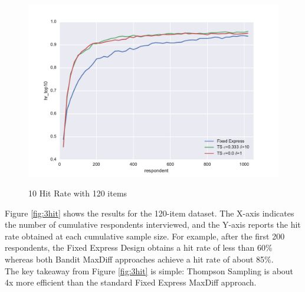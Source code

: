 \documentclass[mksc,blindrev]{informs3} %
\begin{document}
\begin{figure}
\caption{10 Hit Rate with 120 items}
\includegraphics[width=1\textwidth]{plots/10hitrate120show3.pdf}
\label{fig:10hit}
\end{figure}
Figure \ref{fig:3hit} shows the results for the 120-item dataset.  The X-axis indicates the number of cumulative respondents interviewed, and the Y-axis reports the hit rate obtained at each cumulative sample size.  For example, after the first 200 respondents, the Fixed Express Design obtains a hit rate of less than 60\% whereas both Bandit MaxDiff approaches achieve a hit rate of about 85\%.\\
The key takeaway from Figure \ref{fig:3hit} is simple: Thompson Sampling is about 4x more efficient than the standard Fixed Express MaxDiff approach.
\end{document}
